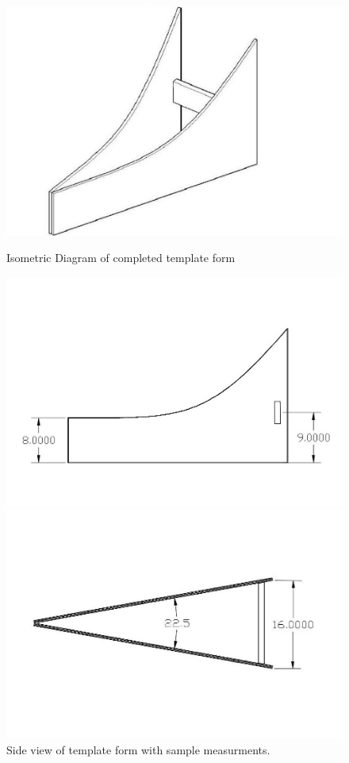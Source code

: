 \documentclass{article}
\begin{document}
\begin{enumerate}
\begin{figure}[!htb]
                      \includegraphics[width=\linewidth]{template_3d}
                      \caption{Isometric Diagram of completed template form}\label{fig:awesome_image1}
                    \endminipage\hfill
                      \includegraphics[width=\linewidth]{template_side}
                      \caption{Side view of template form with sample measurments.}\label{fig:awesome_image2}
                    \endminipage\hfill
                      \includegraphics[width=\linewidth]{template_top}

\end{figure}
\end{enumerate}
\end{document}
